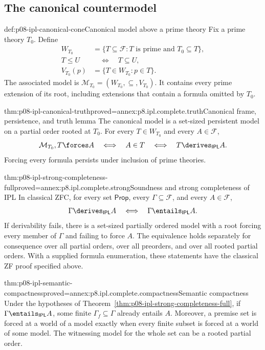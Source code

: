\subsection{The canonical countermodel}
\label{sec:p08-ipl-canonical-countermodel}

\begin{hbdefinition}{def:p08-ipl-canonical-cone}{Canonical model above a prime theory}
Fix a prime theory \(T_0\). Define
\[
 \begin{split}
 W_{T_0}&=\{T\subseteq\mathcal F:T\text{ is prime and }T_0\subseteq T\},\\
 T\leq U&\quad\Longleftrightarrow\quad T\subseteq U,\\
 V_{T_0}(p)&=\{T\in W_{T_0}:p\in T\}.
 \end{split}
\]
The associated model is \(\mathcal M_{T_0}=(W_{T_0},\subseteq,V_{T_0})\).
It contains every prime extension of its root, including extensions that
contain a formula omitted by \(T_0\).
\end{hbdefinition}

\begin{hblemma}{thm:p08-ipl-canonical-truth}{proved=annex:p8.ipl.complete.truth}{Canonical frame, persistence, and truth lemma}
The canonical model is a set-sized persistent model on a partial order
rooted at \(T_0\). For every \(T\in W_{T_0}\) and every
\(A\in\mathcal F\),
\[
 \mathcal M_{T_0},T\forces A
 \quad\Longleftrightarrow\quad A\in T
 \quad\Longleftrightarrow\quad T\derives_{\mathsf{IPL}}A.
\]
Forcing every formula persists under inclusion of prime theories.
\end{hblemma}

\begin{hbtheorem}{thm:p08-ipl-strong-completeness-full}{proved=annex:p8.ipl.complete.strong}{Soundness and strong completeness of IPL}
In classical ZFC, for every set \(\mathsf{Prop}\), every
\(\Gamma\subseteq\mathcal F\), and every \(A\in\mathcal F\),
\[
 \Gamma\derives_{\mathsf{IPL}}A
 \quad\Longleftrightarrow\quad
 \Gamma\entails_{\mathsf{IPL}}A.
\]
If derivability fails, there is a set-sized partially ordered model with a
root forcing every member of \(\Gamma\) and failing to force \(A\).
The equivalence holds separately for consequence over all partial orders,
over all preorders, and over all rooted partial orders. With a supplied
formula enumeration, these statements have the classical ZF proof
specified above.
\end{hbtheorem}

\begin{hbcorollary}{thm:p08-ipl-semantic-compactness}{proved=annex:p8.ipl.complete.compactness}{Semantic compactness}
Under the hypotheses of Theorem~\ref{thm:p08-ipl-strong-completeness-full},
if \(\Gamma\entails_{\mathsf{IPL}}A\), some finite
\(\Gamma_f\subseteq\Gamma\) already entails \(A\).
Moreover, a premise set is forced at a world of a model exactly when
every finite subset is forced at a world of some model. The witnessing
model for the whole set can be a rooted partial order.
\end{hbcorollary}

